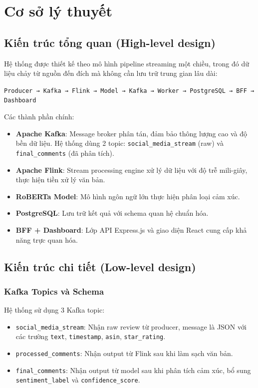 \section{Cơ sở lý thuyết}

\subsection{Kiến trúc tổng quan (High-level design)}

Hệ thống được thiết kế theo mô hình pipeline streaming một chiều, trong đó dữ liệu chảy từ nguồn đến đích mà không cần lưu trữ trung gian lâu dài:

\begin{center}
\texttt{Producer → Kafka → Flink → Model → Kafka → Worker → PostgreSQL → BFF → Dashboard}
\end{center}

Các thành phần chính:

\begin{itemize}
    \item \textbf{Apache Kafka}: Message broker phân tán, đảm bảo thông lượng cao và độ bền dữ liệu. Hệ thống dùng 2 topic: \texttt{social\_media\_stream} (raw) và \texttt{final\_comments} (đã phân tích).
    \item \textbf{Apache Flink}: Stream processing engine xử lý dữ liệu với độ trễ mili-giây, thực hiện tiền xử lý văn bản.
    \item \textbf{RoBERTa Model}: Mô hình ngôn ngữ lớn thực hiện phân loại cảm xúc.
    \item \textbf{PostgreSQL}: Lưu trữ kết quả với schema quan hệ chuẩn hóa.
    \item \textbf{BFF + Dashboard}: Lớp API Express.js và giao diện React cung cấp khả năng trực quan hóa.
\end{itemize}

\subsection{Kiến trúc chi tiết (Low-level design)}

\subsubsection{Kafka Topics và Schema}

Hệ thống sử dụng 3 Kafka topic:

\begin{itemize}
    \item \texttt{social\_media\_stream}: Nhận raw review từ producer, message là JSON với các trường \texttt{text}, \texttt{timestamp}, \texttt{asin}, \texttt{star\_rating}.
    \item \texttt{processed\_comments}: Nhận output từ Flink sau khi làm sạch văn bản.
    \item \texttt{final\_comments}: Nhận output từ model sau khi phân tích cảm xúc, bổ sung \texttt{sentiment\_label} và \texttt{confidence\_score}.
\end{itemize}

